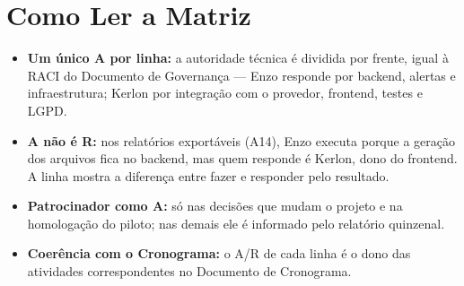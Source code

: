 \documentclass[11pt,a4paper]{article}
\begin{document}
\section{Como Ler a Matriz}
\begin{itemize}[itemsep=3pt]
  \item \textbf{Um único A por linha:} a autoridade técnica é dividida por frente, igual à RACI do Documento de Governança --- Enzo responde por backend, alertas e infraestrutura; Kerlon por integração com o provedor, frontend, testes e LGPD.
  \item \textbf{A não é R:} nos relatórios exportáveis (A14), Enzo executa porque a geração dos arquivos fica no backend, mas quem responde é Kerlon, dono do frontend. A linha mostra a diferença entre fazer e responder pelo resultado.
  \item \textbf{Patrocinador como A:} só nas decisões que mudam o projeto e na homologação do piloto; nas demais ele é informado pelo relatório quinzenal.
  \item \textbf{Coerência com o Cronograma:} o A/R de cada linha é o dono das atividades correspondentes no Documento de Cronograma.
\end{itemize}
\end{document}
